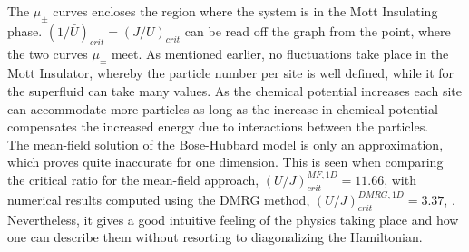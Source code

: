The $\mu_{\pm}$ curves encloses the region where the system is in the Mott Insulating phase. $(1/\bar{U})_{crit} = (J/U)_{crit}$ can be read off the graph from the point, where the two curves $\mu_{\pm}$ meet. As mentioned earlier, no fluctuations take place in the Mott Insulator, whereby the particle number per site is well defined, while it for the superfluid can take many values. As the chemical potential increases each site can accommodate more particles as long as the increase in chemical potential compensates the increased energy due to interactions between the particles.\\
The mean-field solution of the Bose-Hubbard model is only an approximation, which proves quite inaccurate for one dimension. This is seen when comparing the critical ratio for the mean-field approach, $\left( U/J \right)_{crit}^{MF,1D} = 11.66$, with numerical results computed using the DMRG method, $\left( U/J \right)_{crit}^{DMRG,1D} = 3.37$, \cite{Kuhner2000}. Nevertheless, it gives a good intuitive feeling of the physics taking place and how one can describe them without resorting to diagonalizing the Hamiltonian.\\